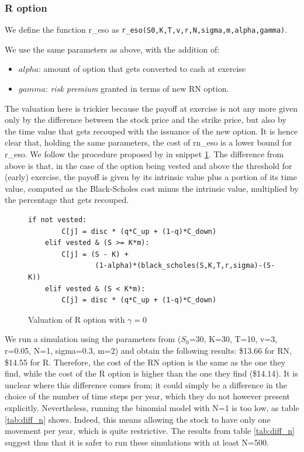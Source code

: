 \subsubsection{R option}
We define the function r\_eso as \verb|r_eso(S0,K,T,v,r,N,sigma,m,alpha,gamma)|.
    


We use the same parameters as above, with the addition of:
\begin{itemize}
    \item $alpha$: amount of option that gets converted to cash at exercise
    \item $gamma$: \textit{risk premium} granted in terms of new RN option. 
\end{itemize}

The valuation here is trickier because the payoff at exercise is not any more given only by the difference between the stock price and the strike price, but also by the time value that gets recouped with the issuance of the new option. It is hence clear that, holding the same parameters, the cost of rn\_eso is a lower bound for r\_eso. We follow the procedure proposed by \cite{huang2013dynamic} in snippet \ref*{fig:val_r_gamma0}. The difference from above is that, in the case of the option being vested and above the threshold for (early) exercise, the payoff is given by its intrinsic value plus a portion of its time value, computed as the Black-Scholes cost minus the intrinsic value, multiplied by the percentage that gets recouped. 

\begin{figure}[H]
    \begin{lstlisting}[breaklines, basicstyle=\ttfamily\small]
    if not vested:                
        C[j] = disc * (q*C_up + (1-q)*C_down)
    elif vested & (S >= K*m): 
        C[j] = (S - K) + 
                (1-alpha)*(black_scholes(S,K,T,r,sigma)-(S-K))
    elif vested & (S < K*m):
        C[j] = disc * (q*C_up + (1-q)*C_down)
    \end{lstlisting}
    \caption{Valuation of R option with $\gamma=0$}
    \label{fig:val_r_gamma0}
\end{figure}

 We run a simulation using the parameters from \cite{huang2013dynamic} ($S_0$=30, K=30, T=10, v=3, r=0.05, N=1, sigma=0.3, m=2) and obtain the following results: \$13.66 for RN, \$14.55 for R. Therefore, the cost of the RN option is the same as the one they find, while the cost of the R option is higher than the one they find (\$14.14). It is unclear where this difference comes from; it could simply be a difference in the choice of the number of time steps per year, which they do not however present explicitly. Nevertheless, running the binomial model with N=1 is too low, as table \ref*{tab:diff_n} shows. Indeed, this means allowing the stock to have only one movement per year, which is quite restrictive. The results from table \ref*{tab:diff_n} suggest thus that it is safer to run these simulations with at least N=500.


